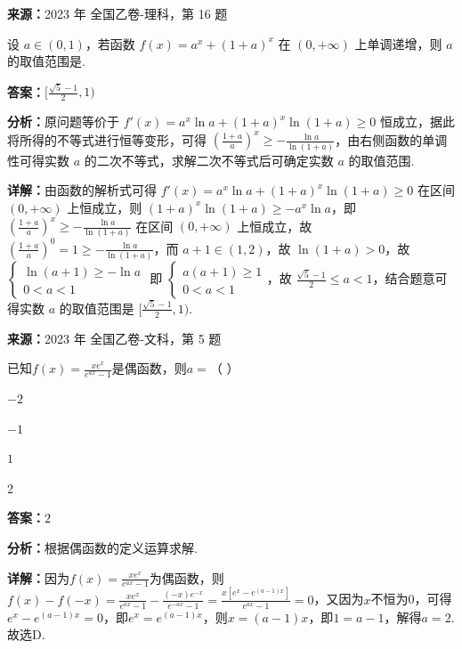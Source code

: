 \begin{question}[points=5]
\textbf{来源：}2023 年 全国乙卷-理科，第 16 题\par
设 $a\in(0,1)$，若函数 $f(x)=a^x+(1+a)^x$ 在 $(0,+\infty)$ 上单调递增，则 $a$ 的取值范围是.
\fillin[{$[\frac{\sqrt{5}-1}{2},1)$}]
\begin{solution}
\textbf{答案：}$[\frac{\sqrt{5}-1}{2},1)$

\textbf{分析：}原问题等价于 $f'(x)=a^x\ln a+(1+a)^x\ln(1+a)\ge 0$ 恒成立，据此将所得的不等式进行恒等变形，可得 $(\frac{1+a}{a})^x\ge -\frac{\ln a}{\ln(1+a)}$，由右侧函数的单调性可得实数 $a$ 的二次不等式，求解二次不等式后可确定实数 $a$ 的取值范围.

\textbf{详解：}由函数的解析式可得 $f'(x)=a^x\ln a+(1+a)^x\ln(1+a)\ge 0$ 在区间 $(0,+\infty)$ 上恒成立，则 $(1+a)^x\ln(1+a)\ge -a^x\ln a$，即 $(\frac{1+a}{a})^x\ge -\frac{\ln a}{\ln(1+a)}$ 在区间 $(0,+\infty)$ 上恒成立，故 $(\frac{1+a}{a})^0=1\ge -\frac{\ln a}{\ln(1+a)}$，而 $a+1\in(1,2)$，故 $\ln(1+a)>0$，故 $\begin{cases} \ln(a+1)\ge -\ln a \\ 0<a<1 \end{cases}$ 即 $\begin{cases} a(a+1)\ge 1 \\ 0<a<1 \end{cases}$，故 $\frac{\sqrt{5}-1}{2}\le a<1$，结合题意可得实数 $a$ 的取值范围是 $[\frac{\sqrt{5}-1}{2},1)$.
\end{solution}
\end{question}

\begin{question}[points=5]
\textbf{来源：}2023 年 全国乙卷-文科，第 5 题\par
已知$f(x)=\frac{xe^x}{e^{ax}-1}$是偶函数，则$a=$（   ）
\begin{choices}
  \item $-2$
  \item $-1$
  \item $1$
  \item $2$
\end{choices}
\begin{solution}
\textbf{答案：}$2$

\textbf{分析：}根据偶函数的定义运算求解.

\textbf{详解：}因为$f(x)=\frac{xe^x}{e^{ax}-1}$为偶函数，则$f(x)-f(-x)=\frac{xe^x}{e^{ax}-1}-\frac{(-x)e^{-x}}{e^{-ax}-1}=\frac{x[e^x-e^{(a-1)x}]}{e^{ax}-1}=0$，又因为$x$不恒为0，可得$e^x-e^{(a-1)x}=0$，即$e^x=e^{(a-1)x}$，则$x=(a-1)x$，即$1=a-1$，解得$a=2$. 故选D.
\end{solution}
\end{question}

